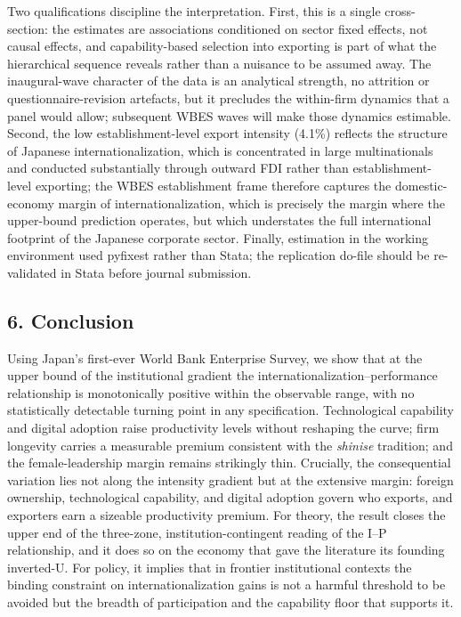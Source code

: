 \documentclass[
  12pt,a4paper]{article}
\begin{document}
Two qualifications discipline the interpretation. First, this is a
single cross-section: the estimates are associations conditioned on
sector fixed effects, not causal effects, and capability-based selection
into exporting is part of what the hierarchical sequence reveals rather
than a nuisance to be assumed away. The inaugural-wave character of the
data is an analytical strength, no attrition or questionnaire-revision
artefacts, but it precludes the within-firm dynamics that a panel would
allow; subsequent WBES waves will make those dynamics estimable. Second,
the low establishment-level export intensity (4.1\%) reflects the
structure of Japanese internationalization, which is concentrated in
large multinationals and conducted substantially through outward FDI
rather than establishment-level exporting; the WBES establishment frame
therefore captures the domestic-economy margin of internationalization,
which is precisely the margin where the upper-bound prediction operates,
but which understates the full international footprint of the Japanese
corporate sector. Finally, estimation in the working environment used
pyfixest rather than Stata; the replication do-file should be
re-validated in Stata before journal submission.

\hypertarget{conclusion}{%
\subsection{6. Conclusion}\label{conclusion}}

Using Japan's first-ever World Bank Enterprise Survey, we show that at
the upper bound of the institutional gradient the
internationalization--performance relationship is monotonically positive
within the observable range, with no statistically detectable turning
point in any specification. Technological capability and digital
adoption raise productivity levels without reshaping the curve; firm
longevity carries a measurable premium consistent with the
\emph{shinise} tradition; and the female-leadership margin remains
strikingly thin. Crucially, the consequential variation lies not along
the intensity gradient but at the extensive margin: foreign ownership,
technological capability, and digital adoption govern who exports, and
exporters earn a sizeable productivity premium. For theory, the result
closes the upper end of the three-zone, institution-contingent reading
of the I--P relationship, and it does so on the economy that gave the
literature its founding inverted-U. For policy, it implies that in
frontier institutional contexts the binding constraint on
internationalization gains is not a harmful threshold to be avoided but
the breadth of participation and the capability floor that supports it.
\end{document}
